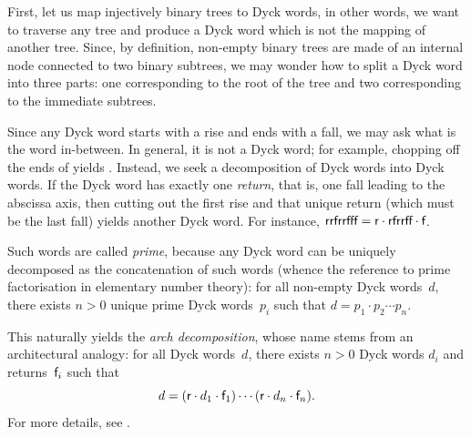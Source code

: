 First, let us map injectively binary trees to Dyck words, in other
words, we want to traverse any tree and produce a Dyck word which is
not the mapping of another tree. Since, by definition, non\hyp{}empty
binary trees are made of an internal node connected to two binary
subtrees, we may wonder how to split a Dyck word into three parts: one
corresponding to the root of the tree and two corresponding to the
immediate subtrees.

Since any Dyck word starts with a rise and ends with a fall, we may
ask what is the word in\hyp{}between. In general, it is not a Dyck
word; for example, chopping off the ends of  yields
. Instead, we seek a decomposition of Dyck words into Dyck
words. If the Dyck word has exactly one \emph{return}, that is, one
fall leading to the abscissa axis, then cutting out the first rise and
that unique return (which must be the last fall) yields another Dyck
word. For instance, \(\textsf{rrfrrfff} = \textsf{r} \cdot \textsf{rfrrff}
\cdot \textsf{f}\).

Such words are called \emph{prime}, because any Dyck word can be
uniquely decomposed as the concatenation of such words (whence the
reference to prime factorisation in elementary number theory): for all
non\hyp{}empty Dyck words~\(d\), there exists \({n > 0}\) unique prime
Dyck words~\(p_i\) such that \(d = p_1 \cdot p_2 \cdots p_n\).

This naturally yields the \emph{arch decomposition}, whose name stems from an
architectural analogy: for all Dyck words~\(d\), there exists \({n >
  0}\) Dyck words \(d_i\) and returns~\(\textsf{f}_i\) such that
\begin{equation*}
d = (\textsf{r} \cdot d_1 \cdot \textsf{f}_1) \cdots (\textsf{r} \cdot d_n
\cdot \textsf{f}_n).
\end{equation*}
For more details, see \cite{PanayotopoulosSapounakis_1995,
  Lothaire_2005, FlajoletSedgewick_2009}.

